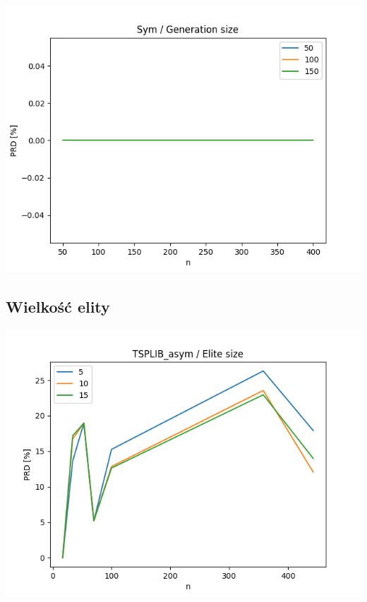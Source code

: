 \documentclass{article}
\begin{document}
\begin{center}
\includegraphics[width=\textwidth, 
                   height = 0.4\textheight, 
                   keepaspectratio]
                  {plots/sym_3_generation_size} 
\end{center}


\subsection{Wielkość elity}

\begin{center}
\includegraphics[width=\textwidth, 
                   height = 0.4\textheight, 
                   keepaspectratio]
                  {plots/tsplib_asym_4_elite_num} 
\end{center}
\end{document}
